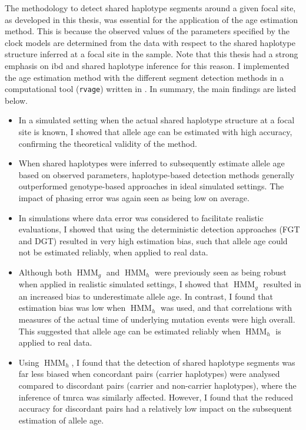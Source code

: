The methodology to detect shared haplotype segments around a given focal site, as developed in this thesis, was essential for the application of the age estimation method.
This is because the observed values of the parameters specified by the clock models are determined from the data with respect to the shared haplotype structure inferred at a focal site in the sample.
Note that this thesis had a strong emphasis on \gls{ibd} and shared haplotype inference for this reason.
I implemented the age estimation method with the different segment detection methods in a computational tool (\texttt{rvage}) written in \cpp.
In summary, the main findings are listed below.
\begin{itemize}
\item%
In a simulated setting when the actual shared haplotype structure at a focal site is known,
I showed that allele age can be estimated with high accuracy, confirming the theoretical validity of the method.
\item%
When shared haplotypes were inferred to subsequently estimate allele age based on observed parameters, haplotype-based detection methods generally outperformed genotype-based approaches in ideal simulated settings.
The impact of phasing error was again seen as being low on average.
\item%
In simulations where data error was considered to facilitate realistic evaluations,
I showed that using the deterministic detection approaches (FGT and DGT) resulted in very high estimation bias,
such that allele age could not be estimated reliably, \eg when applied to real data.
\item%
Although both $\operatorname{HMM}_g$ and $\operatorname{HMM}_h$ were previously seen as being robust when applied in realistic simulated settings, I showed that $\operatorname{HMM}_g$ resulted in an increased bias to underestimate allele age.
In contrast, I found that estimation bias was low when $\operatorname{HMM}_h$ was used, and that correlations with measures of the actual time of underlying mutation events were high overall.
This suggested that allele age can be estimated reliably when $\operatorname{HMM}_h$ is applied to real data.
\item%
Using $\operatorname{HMM}_h$, I found that the detection of shared haplotype segments was far less biased when concordant pairs (carrier haplotypes) were analysed compared to discordant pairs (carrier and non-carrier haplotypes), where the inference of \gls{tmrca} was similarly affected.
However, I found that the reduced accuracy for discordant pairs had a relatively low impact on the subsequent estimation of allele age.

\end{itemize}

